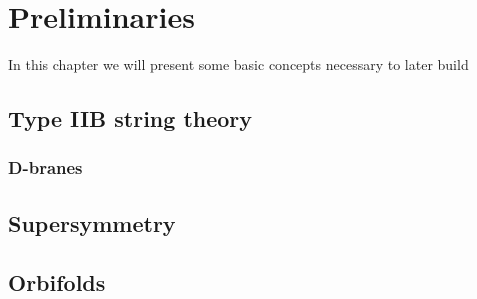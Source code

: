 

\chapter{Preliminaries}
\label{chap:preliminaries}
\pagestyle{fancy}

In this chapter we will present some basic concepts necessary to later build 

\section{Type IIB string theory}



\subsection{D-branes}

\section{Supersymmetry}

\section{Orbifolds}